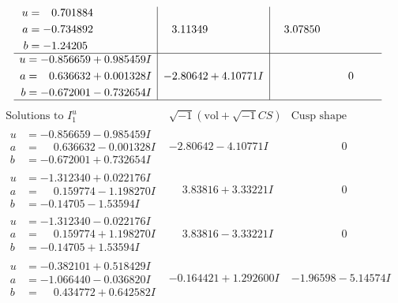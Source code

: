 \documentclass[1p]{elsarticle_modified}
\theoremstyle{definition}
\newcommand{\I}{\sqrt{-1}}
\begin{document}
$$\begin{array}{c|c|c}
\begin{aligned}
u &= \phantom{-}0.701884\phantom{ +0.000000I} \\
a &= -0.734892\phantom{ +0.000000I} \\
b &= -1.24205\phantom{ +0.000000I}\end{aligned}
 & \phantom{-}3.11349\phantom{ +0.000000I} & \phantom{-}3.07850\phantom{ +0.000000I} \\ \hline\begin{aligned}
u &= -0.856659 + 0.985459 I \\
a &= \phantom{-}0.636632 + 0.001328 I \\
b &= -0.672001 - 0.732654 I\end{aligned}
 & -2.80642 + 4.10771 I & \phantom{-0.000000 } 0\\
 \hline 
 \end{array}$$\newpage$$\begin{array}{c|c|c}  
\text{Solutions to }I^u_{1}& \I (\text{vol} + \sqrt{-1}CS) & \text{Cusp shape}\\
 \hline 
\begin{aligned}
u &= -0.856659 - 0.985459 I \\
a &= \phantom{-}0.636632 - 0.001328 I \\
b &= -0.672001 + 0.732654 I\end{aligned}
 & -2.80642 - 4.10771 I & \phantom{-0.000000 } 0 \\ \hline\begin{aligned}
u &= -1.312340 + 0.022176 I \\
a &= \phantom{-}0.159774 - 1.198270 I \\
b &= -0.14705 - 1.53594 I\end{aligned}
 & \phantom{-}3.83816 + 3.33221 I & \phantom{-0.000000 } 0 \\ \hline\begin{aligned}
u &= -1.312340 - 0.022176 I \\
a &= \phantom{-}0.159774 + 1.198270 I \\
b &= -0.14705 + 1.53594 I\end{aligned}
 & \phantom{-}3.83816 - 3.33221 I & \phantom{-0.000000 } 0 \\ \hline\begin{aligned}
u &= -0.382101 + 0.518429 I \\
a &= -1.066440 - 0.036820 I \\
b &= \phantom{-}0.434772 + 0.642582 I\end{aligned}
 & -0.164421 + 1.292600 I & -1.96598 - 5.14574 I \\ \hline\begin{aligned}

\end{aligned}
\end{array}$$
\end{document}
